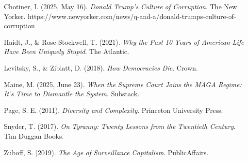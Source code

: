 \documentclass[
]{article}
\begin{document}
Chotiner, I. (2025, May 16). \emph{Donald Trump's Culture of Corruption}. The New Yorker. https://www.newyorker.com/news/q-and-a/donald-trumps-culture-of-corruption

Haidt, J., \& Rose-Stockwell, T. (2021). \emph{Why the Past 10 Years of American Life Have Been Uniquely Stupid}. The Atlantic.

Levitsky, S., \& Ziblatt, D. (2018). \emph{How Democracies Die}. Crown.

Maine, M. (2025, June 23). \emph{When the Supreme Court Joins the MAGA Regime: It's Time to Dismantle the System}. Substack.

Page, S. E. (2011). \emph{Diversity and Complexity}. Princeton University Press.

Snyder, T. (2017). \emph{On Tyranny: Twenty Lessons from the Twentieth Century}. Tim Duggan Books.

Zuboff, S. (2019). \emph{The Age of Surveillance Capitalism}. PublicAffairs.
\end{document}
